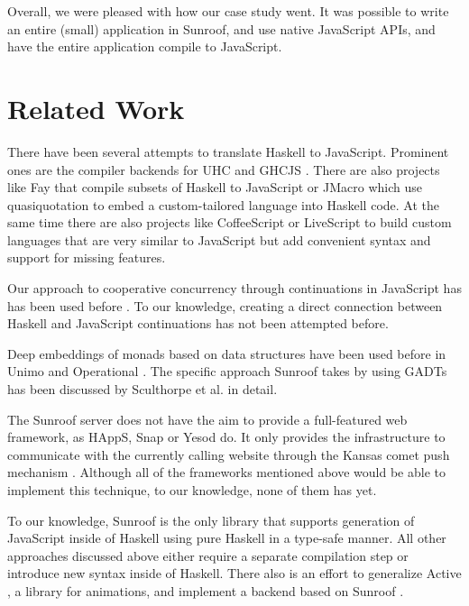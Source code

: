 \documentclass{llncs}
\begin{document}
Overall, we were pleased with how our case study went.
It was possible to write an entire (small) application
in Sunroof, and use native JavaScript APIs, and have
the entire application compile to JavaScript. 

\section{Related Work}

There have been several attempts to translate Haskell to JavaScript.
Prominent ones are the compiler backends for 
UHC \cite{Stutterheim:12:ImprovingUHCJavaScriptBackend} and 
GHCJS \cite{project:ghcjs}. There are also projects like Fay \cite{project:fay} 
that compile subsets of Haskell to JavaScript or JMacro \cite{project:jmacro}
which use quasiquotation \cite{Mainland:07:QuasiquotingHaskell} to embed 
a custom-tailored language into Haskell code.
%
At the same time there are also projects like 
CoffeeScript \cite{project:coffeescript} or LiveScript \cite{project:livescript}
to build custom languages 
that are very similar to JavaScript but add convenient syntax and
support for missing features.

Our approach to cooperative concurrency through continuations in JavaScript has
has been used before 
\cite{Cooper:07:LinksWebProgrammingTiers,Predescu:02:CocoonContinuationBasedControlFlow}.
To our knowledge, creating a direct connection
between Haskell and JavaScript continuations has not been 
attempted before.

Deep embeddings of monads based on data structures have been used before
in Unimo \cite{Lin:06:Unimo} and Operational \cite{Apfelmus:10:Operational,Hackage:10:Operational}. 
The specific approach Sunroof takes 
by using GADTs has been discussed by 
Sculthorpe et al. \cite{Sculthorpe:13:ConstrainedMonads} 
in detail.

The Sunroof server does not have the aim to provide a full-featured 
web framework, as HAppS, Snap or Yesod do. It only provides 
the infrastructure to communicate with the currently calling website
through the Kansas comet \cite{project:kansas-comet} 
push mechanism \cite{pattern:push}. Although all of the
frameworks mentioned above would be able to implement this technique,
to our knowledge, none of them has yet.

To our knowledge, Sunroof is the only library that supports 
generation of JavaScript inside of Haskell using pure Haskell
in a type-safe manner. All other approaches discussed above
either require a separate compilation step or introduce new 
syntax inside of Haskell.
%
There also is an effort to generalize Active \cite{project:active}, a library for animations, and
implement a backend based on Sunroof \cite{project:sunroof-active}.
\end{document}
